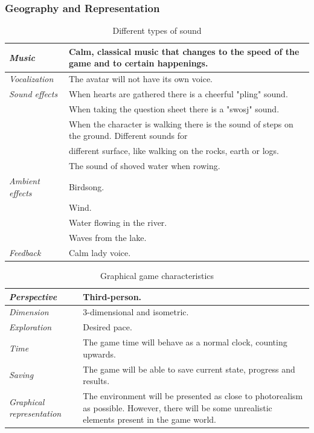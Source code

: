 \subsubsection{Geography and Representation}

\begin{table} [H]
\centering
\begin{tabular}{|p{}|p{}|}
\hline
\emph{Music} & Calm, classical music that changes to the speed of the game and to certain happenings. \\ \hline
\emph{Vocalization} & The avatar will not have its own voice. \\ \hline
\emph{Sound effects} &  When hearts are gathered there is a cheerful "pling" sound.  \\ \cline{2-2}
&  When taking the question sheet there is a "swosj" sound.\\ \cline{2-2}
& When the character is walking there is the sound of steps on the ground. Different sounds for \\ & different surface, like walking on the rocks, earth or logs.\\ \cline{2-2}
& The sound of shoved water when rowing. \\ \hline
\emph{Ambient effects} & Birdsong. \\ \cline{2-2}
& Wind. \\ \cline{2-2}
& Water flowing in the river. \\ \cline{2-2}
& Waves from the lake.\\ \hline
\emph{Feedback} & Calm lady voice. \\ \hline
\end{tabular}
\caption[Different types of sound]{Different types of sound}
\label{tab:sound1}
\end{table}  

\begin{table} [H]
\centering
\begin{tabular}{|p{}|p{}|}
\hline
\emph {Perspective} & Third-person. \\ \hline
\emph{Dimension} &  3-dimensional and isometric. \\ \hline
\emph{Exploration} & Desired pace. \\ \hline
\emph{Time} & The game time will behave as a normal clock, counting upwards. \\ \hline
\emph{Saving} & The game will be able to save current state, progress and results. \\ \hline
\emph{Graphical representation} & The environment will be presented as close to photorealism as possible.  However, there will be some unrealistic elements present in the game world.  \\ \hline
\end{tabular}
\caption[Graphical game characteristics]{Graphical game characteristics}
\label{tab:graphical1}
\end{table}  

